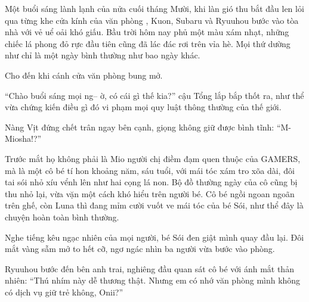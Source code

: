 \documentclass[../main.tex]{subfiles}
\begin{document}
\color{black}


Một buổi sáng lành lạnh của nửa cuối tháng Mười, khi làn gió thu bắt đầu len lỏi qua từng khe cửa kính của văn phòng \hll, Kuon, Subaru và Ryuuhou bước vào tòa nhà với vẻ uể oải khó giấu. Bầu trời hôm nay phủ một màu xám nhạt, những chiếc lá phong đỏ rực đầu tiên cũng đã lác đác rơi trên vỉa hè. Mọi thứ dường như chỉ là một ngày bình thường như bao ngày khác.

Cho đến khi cánh cửa văn phòng bung mở.

``Chào buổi sáng mọi ng-- ờ, có cái gì thế kia?'' cậu Tổng lắp bắp thốt ra, như thể vừa chứng kiến điều gì đó vi phạm mọi quy luật thông thường của thế giới.

Nàng Vịt đứng chết trân ngay bên cạnh, giọng không giữ được bình tĩnh: ``M-Miosha!?''

Trước mắt họ không phải là Mio người chị điềm đạm quen thuộc của GAMERS, mà là một cô bé tí hon khoảng năm, sáu tuổi, với mái tóc xám tro xõa dài, đôi tai sói nhỏ xíu vểnh lên như hai cọng lá non. Bộ đồ thường ngày của cô cũng bị thu nhỏ lại, vừa vặn một cách khó hiểu trên người bé. Cô bé ngồi ngoan ngoãn trên ghế, còn Luna thì đang mỉm cười vuốt ve mái tóc của bé Sói, như thể đây là chuyện hoàn toàn bình thường.


Nghe tiếng kêu ngạc nhiên của mọi người, bé Sói đen giật mình quay đầu lại. Đôi mắt vàng sẫm mở to hết cỡ, ngơ ngác nhìn ba người vừa bước vào phòng.

Ryuuhou bước đến bên anh trai, nghiêng đầu quan sát cô bé với ánh mắt thản nhiên: ``Thú nhím này dễ thương thật. Nhưng em có nhớ văn phòng mình không có dịch vụ giữ trẻ không, Onii?''
\end{document}
